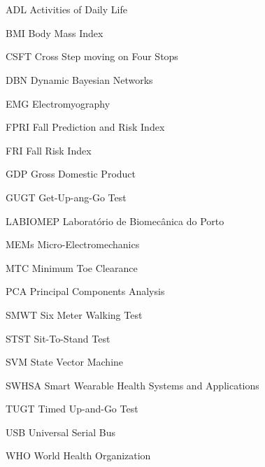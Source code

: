 \newpage
\chapter*{\abbreviationName}
\vspace{-0.3em}


\begin{abbrv}
\item[ADL]                   Activities of Daily Life
\item[BMI]                   Body Mass Index
\item[CSFT]                  Cross Step moving on Four Stops
\item[DBN]                   Dynamic Bayesian Networks
\item[EMG]                   Electromyography
\item[FPRI]                  Fall Prediction and Risk Index
\item[FRI]                   Fall Risk Index
\item[GDP]                   Gross Domestic Product
\item[GUGT]                  Get-Up-ang-Go Test
\item[LABIOMEP]              Laboratório de Biomecânica do Porto
\item[MEMs]                  Micro-Electromechanics
\item[MTC]                   Minimum Toe Clearance
\item[PCA]                   Principal Components Analysis
\item[SMWT]                  Six Meter Walking Test
\item[STST]                  Sit-To-Stand Test
\item[SVM]                   State Vector Machine
\item[SWHSA]                 Smart Wearable Health Systems and Applications
\item[TUGT]                  Timed Up-and-Go Test
\item[USB]                   Universal Serial Bus
\item[WHO]                   World Health Organization
\end{abbrv}